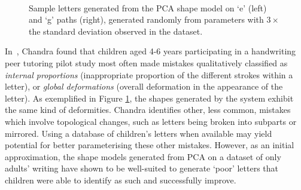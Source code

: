 \documentclass{sig-alternate}
\begin{document}
\begin{figure}[thpb]
\centering
{}
~~~~~
\caption[Sample letters generated from the PCA shape model on `e' and `g'
paths.]{\label{fig:sampleLetters}Sample letters generated from the PCA shape
model on `e' (left) and `g' paths (right), generated randomly from
parameters with $3\times$ the standard deviation observed in the dataset.}

\end{figure}

In~\cite{Chandra2013}, Chandra found that children aged 4-6 years participating
in a handwriting peer tutoring pilot study most often made mistakes
qualitatively classified as \emph{internal proportions} (inappropriate
proportion of the different strokes within a letter), or \emph{global
deformations} (overall deformation in the appearance of the letter). As
exemplified in Figure \ref{fig:sampleLetters}, the shapes generated by the
system exhibit the same kind of deformities. Chandra identifies other, less
common, mistakes which involve topological changes, such as letters being broken
into subparts or mirrored. Using a database of children's letters when available
may yield potential for better parameterising these other mistakes. However, as
an initial approximation, the shape models generated from PCA on a dataset of
only adults' writing have shown to be well-suited to generate `poor' letters
that children were able to identify as such and successfully improve.
\end{document}
